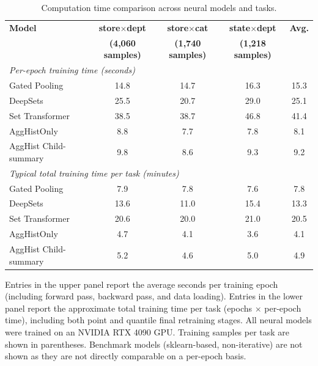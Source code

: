 \documentclass[12pt]{article}
\begin{document}
\begin{table}[H]
  \centering
  \caption{Computation time comparison across neural models and tasks.}
  \label{tab:compute_time}
  \begin{threeparttable}
    \begin{tabular}{lcccc}
      \toprule
      \textbf{Model} & \textbf{store$\times$dept} & \textbf{store$\times$cat} & \textbf{state$\times$dept} & \textbf{Avg.} \\
      & \textbf{(4,060 samples)} & \textbf{(1,740 samples)} & \textbf{(1,218 samples)} & \\
      \midrule
      \multicolumn{5}{l}{\textit{Per-epoch training time (seconds)}} \\
      \quad Gated Pooling        & 14.8 & 14.7 & 16.3 & 15.3 \\
      \quad DeepSets             & 25.5 & 20.7 & 29.0 & 25.1 \\
      \quad Set Transformer      & 38.5 & 38.7 & 46.8 & 41.4 \\
      \quad AggHistOnly          &  8.8 &  7.7 &  7.8 &  8.1 \\
      \quad AggHist Child-summary &  9.8 &  8.6 &  9.3 &  9.2 \\
      \midrule
      \multicolumn{5}{l}{\textit{Typical total training time per task (minutes)}} \\
      \quad Gated Pooling        & 7.9  & 7.8  & 7.6  & 7.8  \\
      \quad DeepSets             & 13.6 & 11.0 & 15.4 & 13.3 \\
      \quad Set Transformer      & 20.6 & 20.0 & 21.0 & 20.5 \\
      \quad AggHistOnly          & 4.7  & 4.1  & 3.6  & 4.1  \\
      \quad AggHist Child-summary & 5.2  & 4.6  & 5.0  & 4.9  \\
      \bottomrule
    \end{tabular}
    \begin{tablenotes}
      \footnotesize \item Entries in the upper panel report the average seconds per training epoch (including forward pass, backward pass, and data loading). Entries in the lower panel report the approximate total training time per task (epochs $\times$ per-epoch time), including both point and quantile final retraining stages. All neural models were trained on an NVIDIA RTX 4090 GPU. Training samples per task are shown in parentheses. Benchmark models (sklearn-based, non-iterative) are not shown as they are not directly comparable on a per-epoch basis.
    \end{tablenotes}
  \end{threeparttable}
\end{table}
\end{document}
